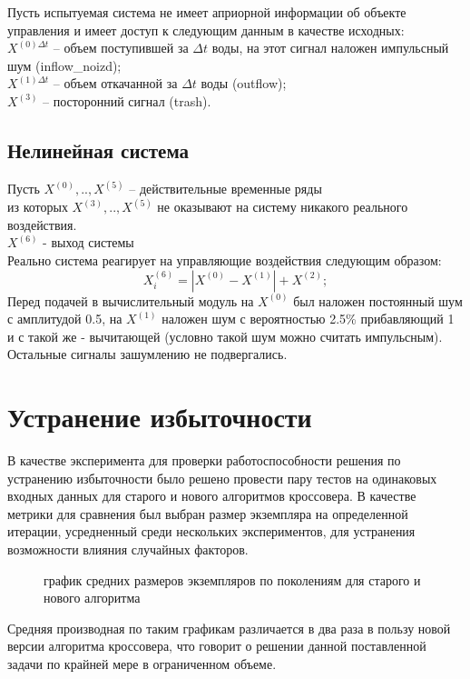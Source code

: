 \documentclass[utf8,usehyperref,12pt]{G7-32}
\begin{document}
Пусть испытуемая система не имеет априорной информации об объекте управления и имеет доступ к следующим данным в качестве исходных:\\
$ X^{(0) \Delta t} $ – объем поступившей за $ \Delta t $ воды, на этот сигнал наложен импульсный шум (inflow\_noizd);\\
$ X^{(1) \Delta t} $ – объем откачанной за $ \Delta t $ воды (outflow);\\
$ X^{(3)} $ – посторонний сигнал (trash).\\
\subsection{Нелинейная система}
Пусть $ X^{(0)}, .., X^{(5)}$ – действительные временные ряды\\
из которых $ X^{(3)}, .., X^{(5)}$ не оказывают на систему никакого реального воздействия.\\
$ X^{(6)} $ - выход системы\\
Реально система реагирует на управляющие воздействия следующим образом:\\
\begin{equation}
X^{(6)}_{i} = |X^{(0)} - X^{(1)}| + X^{(2)};
\end{equation}
Перед подачей в вычислительный модуль на $ X^{(0)} $ был наложен постоянный шум с амплитудой 0.5, на $ X^{(1)} $ наложен шум с вероятностью 2.5\% прибавляющий 1 и с такой же - вычитающей (условно такой шум можно считать импульсным). Остальные сигналы зашумлению не подвергались.

\section{Устранение избыточности}
В качестве эксперимента для проверки работоспособности решения по устранению избыточности было решено провести пару тестов на одинаковых входных данных для старого и нового алгоритмов кроссовера. В качестве метрики для сравнения был выбран размер экземпляра на определенной итерации, усредненный среди нескольких экспериментов, для устранения возможности влияния случайных факторов.
\begin{figure}[H]
 \caption{график средних размеров экземпляров по поколениям для старого и нового алгоритма}\label{cross_diff}
\end{figure}
Средняя производная по таким графикам различается в два раза в пользу новой версии алгоритма кроссовера, что говорит о решении данной поставленной задачи по крайней мере в ограниченном объеме.
\end{document}
